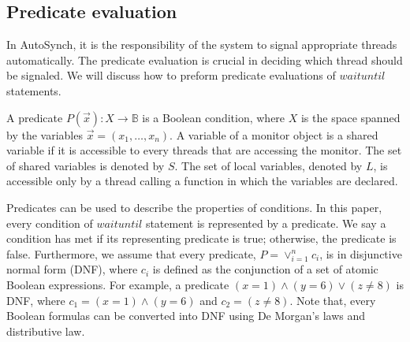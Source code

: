 \documentclass[preprint]{sigplanconf}
\begin{document}
\subsection{Predicate evaluation} \label{sec:globalization}
In AutoSynch, it is the responsibility of the system to signal appropriate 
threads automatically. The predicate evaluation is crucial in deciding which
thread should be signaled. We will discuss how to preform predicate evaluations
of $waituntil$ statements. 

A predicate $P(\vec{x}): X \rightarrow \mathbb{B}$ is a Boolean condition, 
where $X$ is the space spanned by the variables $\vec{x}=(x_1, \dots, x_n)$. 
A variable of a monitor object is a shared variable if it is accessible to every 
threads that are accessing the monitor. The set of shared variables is denoted by 
$S$. The set of local variables, denoted by $L$, is 
accessible only by a thread calling a function in which the variables are declared. 

Predicates can be used to describe the properties of conditions. In this paper,
every condition of $waituntil$ statement is represented by a predicate. We say
a condition has met if its representing predicate is true; otherwise, the
predicate is false. 
Furthermore, we assume that every predicate, $P = \vee_{i=1}^nc_i$, is in 
disjunctive normal form (DNF), where $c_i$ is defined as the conjunction of a 
set of atomic Boolean expressions. For example, a predicate $(x = 1) \wedge 
(y = 6) \vee (z \ne 8)$ is DNF, where $c_1 = (x = 1) \wedge (y = 6)$ and $c_2 = 
(z \ne 8)$. Note that, every Boolean formulas can be converted into DNF using 
De Morgan's laws and distributive law. 
\end{document}
